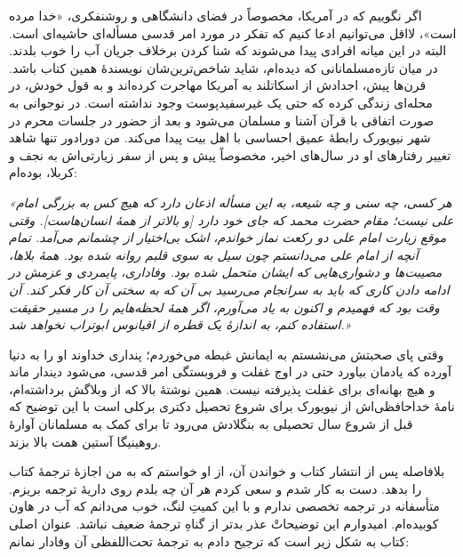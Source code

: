  {
	اگر نگوییم که در آمریکا، مخصوصاً در فضای دانشگاهی و روشنفکری، «خدا مرده است»، لااقل می‌توانیم ادعا کنیم که تفکر در مورد امر قدسی مسأله‌ای حاشیه‌ای است. البته در این میانه افرادی پیدا می‌شوند که شنا کردن برخلاف جریان آب را خوب بلدند. در میان تازه‌مسلمانانی که دیده‌ام، شاید شاخص‌ترین‌شان نویسندهٔ همین کتاب باشد.  قرن‌ها پیش، اجدادش از اسکاتلند به آمریکا مهاجرت کرده‌اند و به قول خودش، در محله‌ای زندگی کرده که حتی یک غیرسفید‌پوست وجود نداشته است. در نوجوانی به صورت اتفاقی با قرآن آشنا و مسلمان می‌شود و بعد از حضور در جلسات محرم در شهر نیویورک رابطهٔ عمیق احساسی با اهل بیت {} پیدا می‌کند. من دورادور تنها شاهد تغییر رفتارهای او در سال‌های اخیر، مخصوصاً پیش و پس از سفر زیارتی‌اش به نجف و کربلا، بوده‌ام:

\textit{
	«هر کسی، چه سنی و چه شیعه، به این مسأله اذعان دارد که هیچ کس به بزرگی امام علی{} نیست؛ مقام حضرت محمد{} که جای خود دارد [و بالاتر از همهٔ انسان‌هاست]. وقتی موقع زیارت امام علی{} دو رکعت نماز خواندم، اشک بی‌اختیار از چشمانم می‌آمد.  تمام آنچه از امام علی{} می‌دانستم چون سیل به سوی قلبم روانه شده بود. همهٔ بلاها، مصیبت‌ها و دشواری‌هایی که ایشان متحمل شده بود. وفاداری، پایمردی و عزمش در ادامه دادن کاری که باید به سرانجام می‌رسید بی آن که به سختی آن کار فکر کند. آن وقت بود که فهمیدم و اکنون به یاد می‌آورم، اگر همهٔ لحظه‌هایم را در مسیر حقیقت استفاده کنم، به اندازهٔ یک قطره از اقیانوس ابوتراب{} نخواهد شد.»}
	
	وقتی پای صحبتش می‌نشستم به ایمانش غبطه می‌خوردم؛ پنداری خداوند او را به دنیا آورده که یادمان بیاورد حتی در اوج غفلت و فروبستگی امر قدسی، می‌شود دیندار ماند و هیچ بهانه‌ای برای غفلت پذیرفته نیست. همین نوشتهٔ بالا که از وبلاگش برداشته‌ام، نامهٔ خداحافظی‌اش از نیویورک برای شروع تحصیل دکتری برکلی است با این توضیح که قبل از شروع سال تحصیلی به بنگلادش می‌رود تا برای کمک به مسلمانان آوارهٔ روهینیگا آستین همت  بالا بزند.
	
	بلافاصله پس از انتشار کتاب و خواندن آن، از او خواستم که به من اجازهٔ ترجمهٔ کتاب را بدهد. دست به کار شدم و سعی کردم هر آن چه بلدم روی داریهٔ ترجمه بریزم. متأسفانه  در ترجمه تخصصی ندارم و با این کمیتِ لنگ، خوب می‌دانم که آب در هاون کوبیده‌ام. امیدوارم این توضیحاتْ عذر بدتر از گناهِ ترجمهٔ ضعیف نباشد. عنوان اصلی کتاب به شکل زیر است که ترجیح دادم به ترجمهٔ تحت‌اللفظی آن وفادار نمانم:
	\begin{center}
{\small		{} }
	\end{center}
	
}
